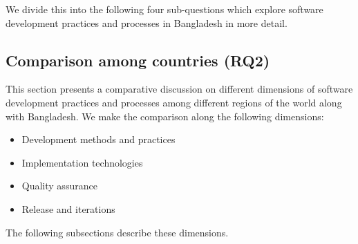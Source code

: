 We divide this into the following four sub-questions which explore software development practices and processes in Bangladesh in more detail.






\subsection{Comparison among countries (RQ2)}
\label{RQ2}

This section presents a comparative discussion on different dimensions of software development practices and processes among different regions of the world along with Bangladesh. We make the comparison along the following dimensions:

\begin{itemize}
\item Development methods and practices
\item Implementation technologies
\item Quality assurance
\item Release and iterations
\end{itemize}

The following subsections describe these dimensions.




% 





% 
% 
